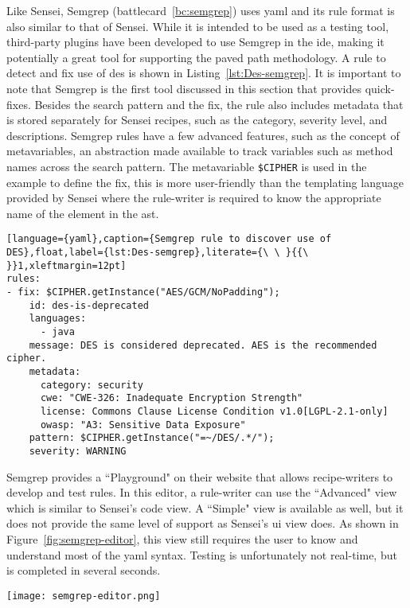 Like Sensei, Semgrep (battlecard~\ref{bc:semgrep}) uses \gls{yaml} and its rule format is also similar to that of Sensei.
While it is intended to be used as a testing tool, third-party plugins have been developed to use Semgrep in the \gls{ide}, making it potentially a great tool for supporting the paved path methodology.
A rule to detect and fix use of \gls{des} is shown in Listing~\ref{lst:Des-semgrep}.
It is important to note that Semgrep is the first tool discussed in this section that provides quick-fixes.
Besides the search pattern and the fix, the rule also includes metadata that is stored separately for Sensei recipes, such as the category, severity level, and descriptions.
Semgrep rules have a few advanced features, such as the concept of metavariables, an abstraction made available to track variables such as method names across the search pattern.
The metavariable \texttt{\$CIPHER} is used in the example to define the fix, this is more user-friendly than the templating language provided by Sensei where the rule-writer is required to know the appropriate name of the element in the \gls{ast}.

\begin{lstlisting}[language={yaml},caption={Semgrep rule to discover use of DES},float,label={lst:Des-semgrep},literate={\ \ }{{\ }}1,xleftmargin=12pt]
rules:
- fix: $CIPHER.getInstance("AES/GCM/NoPadding");
    id: des-is-deprecated
    languages:
      - java
    message: DES is considered deprecated. AES is the recommended cipher.
    metadata:
      category: security
      cwe: "CWE-326: Inadequate Encryption Strength"
      license: Commons Clause License Condition v1.0[LGPL-2.1-only]
      owasp: "A3: Sensitive Data Exposure"
    pattern: $CIPHER.getInstance("=~/DES/.*/");
    severity: WARNING
\end{lstlisting}

Semgrep provides a ``Playground" on their website that allows recipe-writers to develop and test rules.
In this editor, a rule-writer can use the ``Advanced" view which is similar to Sensei's code view.
A ``Simple" view is available as well, but it does not provide the same level of support as Sensei's \gls{ui} view does.
As shown in Figure~\ref{fig:semgrep-editor}, this view still requires the user to know and understand most of the \gls{yaml} syntax.
Testing is unfortunately not real-time, but is completed in several seconds.

\begin{sidewaysfigure}
  \centering
  \texttt{[image: semgrep-editor.png]}
  \caption[Semgrep playground editor]{Semgrep's ``Simple" view in the Playground rule editor still requires use of the \gls{yaml} syntax.}
  \label{fig:semgrep-editor} 
\end{sidewaysfigure}

